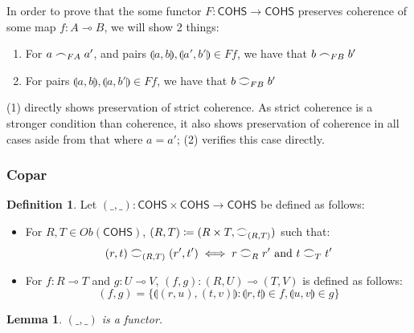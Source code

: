 \documentclass[11pt, oneside]{article}
\theoremstyle{plain}
\newtheorem{lemma}[theorem]{Lemma}
\theoremstyle{definition}
\newtheorem{definition}[theorem]{Definition}
\newcommand{\lp}{\llparenthesis}
\newcommand{\rp}{\rrparenthesis}
\newcommand{\cohs}{{\mathsf{COHS}}}
\newcommand{\coh}[1][]{\mathrel{\vcenter{\offinterlineskip\hbox{$\frown$}\vskip0.2ex\hbox{$\smile$}}_{\ifx\\#1\\\else#1\fi}}}
\newcommand{\scoh}[1][]{\mathrel{\frown}_{\ifx\\#1\\\else#1\fi}}
\begin{document}
In order to prove that the some functor $F:\cohs\to\cohs$ preserves coherence of some map $f:A\multimap B$, we will show 2 things:
\begin{enumerate}
    \item
    For $a\scoh[FA]a'$, and pairs $\lp a,b\rp,\lp a',b'\rp\in Ff$, we have that $b\scoh[FB]b'$
    \item 
    For pairs $\lp a,b\rp,\lp a,b'\rp\in Ff$, we have that $b\coh[FB]b'$
\end{enumerate}
(1) directly shows preservation of strict coherence. As strict coherence is a stronger condition than coherence, it also shows preservation of coherence in all cases aside from that where $a=a'$;
(2) verifies this case directly.

\subsubsection{Copar}
\begin{definition}
    Let $(\_,\_):\cohs\times\cohs\to\cohs$ be defined as follows:
    \begin{itemize}
        \item
        For $R,T\in Ob(\cohs)$, $(R,T) \coloneqq (R\times T,\coh[(R,T)])$ such that:
        $$(r,t)\coh[(R,T)](r',t')\iff r\coh[R]r'\text{ and }t\coh[T]t'$$

        \item
        For $f:R\multimap T$ and $g:U\multimap V$, 
        $(f,g):(R,U)\multimap(T,V)$ is defined as follows:
        $$(f,g)=\{\lp(r,u),(t,v)\rp:\lp r,t\rp\in f,\lp u,v\rp\in g\}$$
    \end{itemize}
\end{definition}

\begin{lemma}\label{lem:CoparIsFunctor}
    $(\_,\_)$ is a functor.
\end{lemma}
\end{document}
